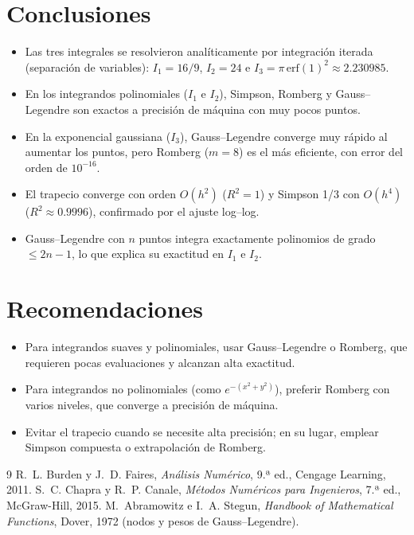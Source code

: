 \documentclass[12pt,a4paper]{article}
\begin{document}
\section{Conclusiones}
\begin{itemize}[leftmargin=1.4em]
  \item Las tres integrales se resolvieron analíticamente por integración
        iterada (separación de variables): $I_1=16/9$, $I_2=24$ e
        $I_3=\pi\,\mathrm{erf}(1)^2\approx 2.230985$.
  \item En los integrandos polinomiales ($I_1$ e $I_2$), Simpson, Romberg y
        Gauss--Legendre son exactos a precisión de máquina con muy pocos puntos.
  \item En la exponencial gaussiana ($I_3$), Gauss--Legendre converge muy rápido
        al aumentar los puntos, pero Romberg ($m=8$) es el más eficiente, con
        error del orden de $10^{-16}$.
  \item El trapecio converge con orden $O(h^2)$ ($R^2=1$) y Simpson 1/3 con
        $O(h^4)$ ($R^2\approx0.9996$), confirmado por el ajuste log--log.
  \item Gauss--Legendre con $n$ puntos integra exactamente polinomios de grado
        $\le 2n-1$, lo que explica su exactitud en $I_1$ e $I_2$.
\end{itemize}

\section{Recomendaciones}
\begin{itemize}[leftmargin=1.4em]
  \item Para integrandos suaves y polinomiales, usar Gauss--Legendre o Romberg,
        que requieren pocas evaluaciones y alcanzan alta exactitud.
  \item Para integrandos no polinomiales (como $e^{-(x^2+y^2)}$), preferir
        Romberg con varios niveles, que converge a precisión de máquina.
  \item Evitar el trapecio cuando se necesite alta precisión; en su lugar,
        emplear Simpson compuesta o extrapolación de Romberg.
\end{itemize}

\begin{thebibliography}{9}
 R.~L. Burden y J.~D. Faires, \emph{Análisis Numérico},
9.ª ed., Cengage Learning, 2011.
 S.~C. Chapra y R.~P. Canale, \emph{Métodos Numéricos para
Ingenieros}, 7.ª ed., McGraw-Hill, 2015.
 M.~Abramowitz e I.~A. Stegun, \emph{Handbook of
Mathematical Functions}, Dover, 1972 (nodos y pesos de Gauss--Legendre).
\end{thebibliography}
\end{document}
